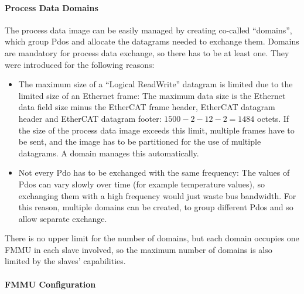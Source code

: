 \documentclass[a4paper,12pt,BCOR6mm,bibtotoc,idxtotoc]{scrbook}
\begin{document}
\paragraph{Process Data Domains}

The process data image can be easily managed by creating co-called
``domains'', which group Pdos and allocate the datagrams needed to
exchange them. Domains are mandatory for process data exchange, so
there has to be at least one. They were introduced for the following
reasons:

\begin{itemize}
\item The maximum size of a ``Logical ReadWrite'' datagram is limited
  due to the limited size of an Ethernet frame: The maximum data size
  is the Ethernet data field size minus the EtherCAT frame header,
  EtherCAT datagram header and EtherCAT datagram footer: $1500 - 2 -
  12 - 2 = 1484$ octets. If the size of the process data image exceeds
  this limit, multiple frames have to be sent, and the image has to be
  partitioned for the use of multiple datagrams. A domain manages this
  automatically.
\item Not every Pdo has to be exchanged with the same frequency: The
  values of Pdos can vary slowly over time (for example temperature
  values), so exchanging them with a high frequency would just waste
  bus bandwidth. For this reason, multiple domains can be created, to
  group different Pdos and so allow separate exchange.
\end{itemize}

There is no upper limit for the number of domains, but each domain
occupies one FMMU in each slave involved, so the maximum number of
domains is also limited by the slaves' capabilities.

\paragraph{FMMU Configuration}
\end{document}
